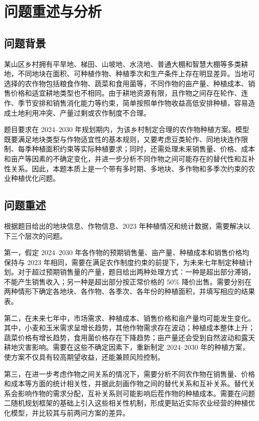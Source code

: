 \section{问题重述与分析}

\subsection{问题背景}

某山区乡村拥有平旱地、梯田、山坡地、水浇地、普通大棚和智慧大棚等多类耕地，不同地块在面积、可种植作物、种植季次和生产条件上存在明显差异。当地可选择的农作物包括粮食作物、蔬菜和食用菌等，不同作物的亩产量、种植成本、销售价格和适宜耕地类型也不相同。由于耕地资源有限，且作物之间存在轮作、连作、季节安排和销售消化能力等约束，简单按照单作物收益高低安排种植，容易造成土地利用冲突、产量过剩或农作制度不合理。

题目要求在 2024--2030 年规划期内，为该乡村制定合理的农作物种植方案。模型既要满足地块类型与作物适宜性的基本规则，又要考虑豆类轮作、同地块连作限制、每季种植面积约束等实际种植要求；同时，还需处理未来销售量、价格、成本和亩产等因素的不确定变化，并进一步分析不同作物之间可能存在的替代性和互补性关系。因此，本题本质上是一个带有多时期、多地块、多作物和多季次约束的农业种植优化问题。

\subsection{问题重述}

根据题目给出的地块信息、作物信息、2023 年种植情况和统计数据，需要解决以下三个层次的问题。

第一，假定 2024--2030 年各作物的预期销售量、亩产量、种植成本和销售价格均保持与 2023 年相同，需要在满足农作制度约束的前提下，为未来七年制定种植计划。对于超过预期销售量的产量，题目给出两种处理方式：一种是超出部分滞销，不能产生销售收入；另一种是超出部分按正常价格的 50\% 降价出售。需要分别在两种情形下确定各地块、各作物、各季次、各年份的种植面积，并填写相应的结果表。

第二，在未来七年中，市场需求、种植成本、销售价格和亩产量均可能发生变化。其中，小麦和玉米需求呈增长趋势，其他作物需求存在波动；种植成本整体上升；蔬菜价格有增长趋势，食用菌价格存在下降趋势；亩产量还会受到自然波动和露天耕地灾害影响。需要在这些不确定因素下，重新制定 2024--2030 年的种植方案，使方案不仅具有较高期望收益，还能兼顾风险控制。

第三，在进一步考虑作物之间关系的情况下，需要分析不同农作物在销售量、价格和成本等方面的统计相关性，并据此刻画作物之间的替代关系和互补关系。替代关系会影响作物的需求分配，互补关系则可能影响后茬作物的种植成本。需要在问题二随机规划框架的基础上引入这些相关性机制，形成更贴近实际农业经营的种植优化模型，并比较其与前两问方案的差异。

